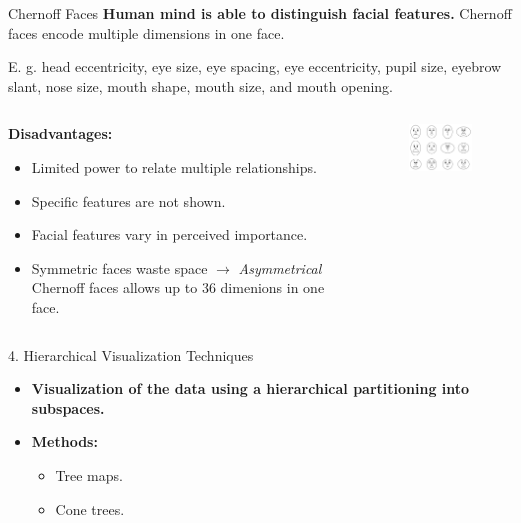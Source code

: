 \begin{frame}{Chernoff Faces}
  \textbf{Human mind is able to distinguish facial features.} Chernoff faces
  encode multiple dimensions in one face.

  E. g. head eccentricity, eye size, eye spacing, eye eccentricity, pupil size,
  eyebrow slant, nose size, mouth shape, mouth size, and mouth opening.

  \vspace*{1em}
  \begin{columns}[t]
    \hspace*{1.4em}
    \begin{column}{0.6\textwidth}
      \textbf{Disadvantages:}
      \begin{itemize}
      \item Limited power to relate multiple relationships.
      \item Specific features are not shown.
      \item Facial features vary in perceived importance.
      \item Symmetric faces waste space $\rightarrow$ \textit{Asymmetrical } Chernoff
        faces allows up to 36 dimenions in one face.
      \end{itemize}
    \end{column}
    \begin{column}{0.4\textwidth}
      \vspace*{-2em}
        \begin{figure}
          \centering
          \includegraphics[width=5cm]{img/chernoff_faces.png}
        \end{figure}
    \end{column}
  \end{columns}
\end{frame}


\begin{frame}{4. Hierarchical Visualization Techniques}
  \centering
  \begin{itemize}
  \item \textbf{Visualization of the data using a hierarchical partitioning into subspaces.}
  \item \textbf{Methods:}
    \begin{itemize}
    \item Tree maps.
    \item Cone trees.
    \end{itemize}
  \end{itemize}
\end{frame}


